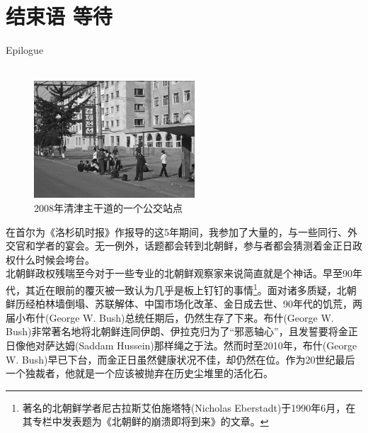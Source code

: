 \fancyhead[RO]{{\tiny{\textcolor{Gray}{\FA \ }}}\thepage}
\fancyhead[LE]{{\tiny{\textcolor{Gray}{\FA \ }}}\thepage}
\fancyfoot[LE,RO]{}
\fancyfoot[LO,CE]{}
\fancyfoot[CO,RE]{}
\chapter*{结束语 等待}
\vspace{15mm}
\begin{flushright}
	\textcolor{PinYinColor}{\EN \huge{Epilogue\\
	\ \\}}
\end{flushright}
\begin{figure}[!htbp]
	\centering
	\includegraphics[width=6cm]{./Chapters/Images/21.jpg}
	\caption*{2008年清津主干道的一个公交站点}
\end{figure}


在首尔为《洛杉矶时报》作报导的这5年期间，我参加了大量的，与一些同行、外交官和学者的宴会。无一例外，话题都会转到北朝鲜，参与者都会猜测着金正日政权什么时候会垮台。\\

北朝鲜政权残喘至今对于一些专业的北朝鲜观察家来说简直就是个神话。早至90年代，其近在眼前的覆灭被一致认为几乎是板上钉钉的事情\footnote{著名的北朝鲜学者尼古拉斯艾伯施塔特(Nicholas Eberstadt)于1990年6月，在其专栏中发表题为《北朝鲜的崩溃即将到来》的文章。}。面对诸多质疑，北朝鲜历经柏林墙倒塌、苏联解体、中国市场化改革、金日成去世、90年代的饥荒，两届小布什(George W. Bush)总统任期后，仍然生存了下来。布什(George W. Bush)非常著名地将北朝鲜连同伊朗、伊拉克归为了“邪恶轴心”，且发誓要将金正日像他对萨达姆(Saddam Hussein)那样绳之于法。然而时至2010年，布什(George W. Bush)早已下台，而金正日虽然健康状况不佳，却仍然在位。作为20世纪最后一个独裁者，他就是一个应该被抛弃在历史尘堆里的活化石。\\


